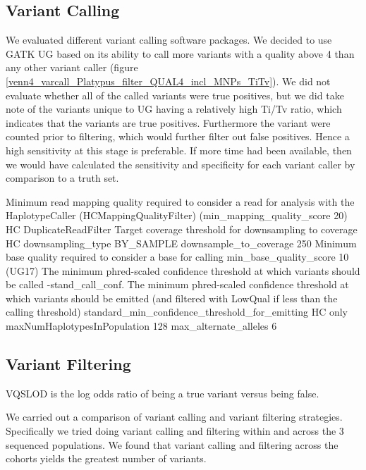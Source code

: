 \subsection{Variant Calling}
We evaluated different variant calling software packages. We decided to use \gls{GATK} \gls{UG} based on its ability to call more variants with a quality above 4 than any other variant caller (figure \ref{venn4_varcall_Platypus_filter_QUAL4_incl_MNPs_TiTv}). We did not evaluate whether all of the called variants were true positives, but we did take note of the variants unique to \gls{UG} having a relatively high Ti/Tv ratio, which indicates that the variants are true positives. Furthermore the variant were counted prior to filtering, which would further filter out false positives. Hence a high sensitivity at this stage is preferable. If more time had been available, then we would have calculated the sensitivity and specificity for each variant caller by comparison to a truth set.

Minimum read mapping quality required to consider a read for analysis with the HaplotypeCaller (HCMappingQualityFilter) (\-\-min\_mapping\_quality\_score 20)
HC DuplicateReadFilter
Target coverage threshold for downsampling to coverage HC \-\-downsampling\_type BY\_SAMPLE \-\-downsample\_to\_coverage 250
Minimum base quality required to consider a base for calling \-\-min\_base\_quality\_score 10 (UG17)
The minimum phred-scaled confidence threshold at which variants should be called -stand\_call\_conf.
The minimum phred-scaled confidence threshold at which variants should be emitted (and filtered with LowQual if less than the calling threshold) \-\-standard\_min\_confidence\_threshold\_for\_emitting
HC only maxNumHaplotypesInPopulation 128
max\_alternate\_alleles 6

\subsection{Variant Filtering}

%


VQSLOD is the log odds ratio of being a true variant versus being false.

We carried out a comparison of variant calling and variant filtering strategies. Specifically we tried doing variant calling and filtering within and across the 3 sequenced populations. We found that variant calling and filtering across the cohorts yields the greatest number of variants.

